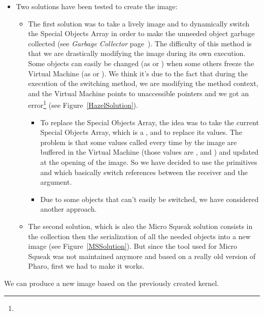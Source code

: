 \begin{itemize}
	\item[] Two solutions have been tested to create the image:
		\begin{itemize}\label{NilChange}
			\item The first solution was to take a lively image and to dynamically switch the \gls{Special Objects Array} in order to make the unneeded object garbage collected (see \emph{\gls{Garbage Collector}} page~\pageref{glossary}). The difficulty of this method is that we are drastically modifying the image during its own execution. Some objects can easily be changed (as  or ) when some others freeze the Virtual Machine (as  or ). We think it's due to the fact that during the execution of the switching method, we are modifying the method context, and the Virtual Machine points to unaccessible pointers and we got an error\footnote{} (see Figure~\ref{HazelSolution}).
			\begin{itemize}
				\item To replace the \gls{Special Objects Array}, the idea was to take the current \gls{Special Objects Array}, which is a , and to replace its values. The problem is that some values called every time by the image are buffered in the Virtual Machine (those values are , and ) and updated at the opening of the image. So we have decided to use the \glspl{primitive}  and  which basically switch references between the receiver and the argument.
				\item Due to some objects that can't easily be switched, we have considered another approach.
			\end{itemize}
			\item The second solution, which is also the \gls{Micro Squeak} solution consists in the collection then the serialization of all the needed objects into a new image (see Figure~\ref{MSSolution}). But since the tool used for \gls{Micro Squeak} was not maintained anymore and based on a really old version of Pharo, first we had to make it works.
		\end{itemize}
\end{itemize}

\inanutshell We can produce a new image based on the previously created kernel.